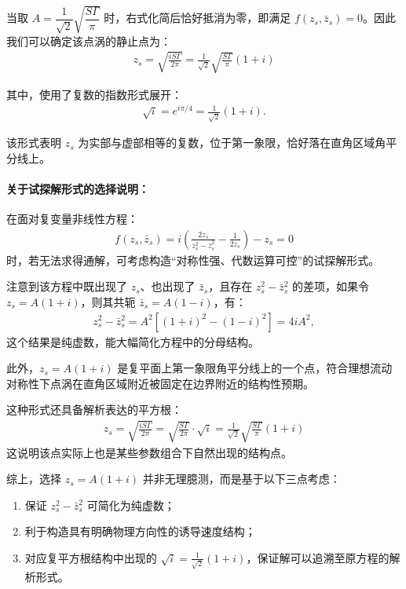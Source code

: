 当取 $A = \dfrac{1}{\sqrt{2}} \sqrt{ \dfrac{S\Gamma}{\pi} }$ 时，右式化简后恰好抵消为零，即满足 $f(z_s, \bar{z}_s)=0$。因此我们可以确定该点涡的静止点为：
\begin{align}
    \boxed{
    z_{s} = \sqrt{ \frac{i S \Gamma}{2\pi} } 
    = \frac{1}{\sqrt{2}} \sqrt{ \frac{S \Gamma}{\pi} } (1+i)
    }
\end{align}

其中，使用了复数的指数形式展开：
\begin{align*}
    \sqrt{i} = e^{i\pi/4} = \frac{1}{\sqrt{2}}(1+i).
\end{align*}

该形式表明 $z_s$ 为实部与虚部相等的复数，位于第一象限，恰好落在直角区域角平分线上。

\paragraph{关于试探解形式的选择说明：}

在面对复变量非线性方程：
\begin{align}
    f(z_s, \bar{z}_s) = i\left( \frac{2z_s}{z_s^2 - \bar{z}_s^2} - \frac{1}{2z_s} \right) - z_s = 0
\end{align}
时，若无法求得通解，可考虑构造“对称性强、代数运算可控”的试探解形式。

注意到该方程中既出现了 \( z_s \)、也出现了 \( \bar{z}_s \)，且存在 \( z_s^2 - \bar{z}_s^2 \) 的差项，如果令 \( z_s = A(1+i) \)，则其共轭 \( \bar{z}_s = A(1-i) \)，有：
\begin{align*}
    z_s^2 - \bar{z}_s^2 = A^2[(1+i)^2 - (1-i)^2] = 4iA^2,
\end{align*}
这个结果是纯虚数，能大幅简化方程中的分母结构。

此外，\( z_s = A(1+i) \) 是复平面上第一象限角平分线上的一个点，符合理想流动对称性下点涡在直角区域附近被固定在边界附近的结构性预期。

这种形式还具备解析表达的平方根：
\begin{align}
    z_s = \sqrt{ \frac{iS\Gamma}{2\pi} } = \sqrt{ \frac{S\Gamma}{2\pi} } \cdot \sqrt{i} = \frac{1}{\sqrt{2}} \sqrt{ \frac{S\Gamma}{\pi} } (1+i)
\end{align}
这说明该点实际上也是某些参数组合下自然出现的结构点。

综上，选择 \( z_s = A(1+i) \) 并非无理臆测，而是基于以下三点考虑：
\begin{enumerate}
    \item 保证 \( z_s^2 - \bar{z}_s^2 \) 可简化为纯虚数；
    \item 利于构造具有明确物理方向性的诱导速度结构；
    \item 对应复平方根结构中出现的 \( \sqrt{i} = \frac{1}{\sqrt{2}}(1+i) \)，保证解可以追溯至原方程的解析形式。
\end{enumerate}


